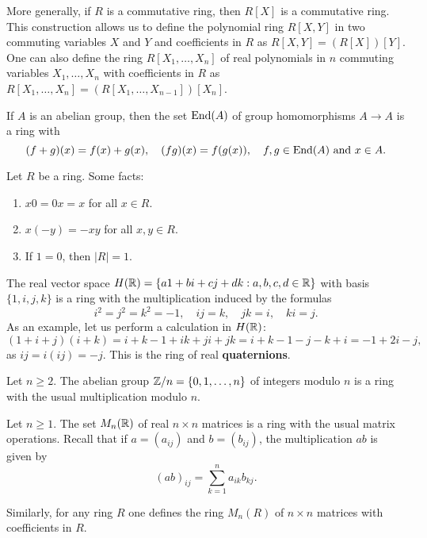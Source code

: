 More generally, if $R$ is a commutative ring, then $R[X]$ is a commutative ring. This construction
allows us to define 
the polynomial ring $R[X,Y]$ in two commuting variables $X$ and $Y$ and coefficients in $R$ as 
$R[X,Y]=(R[X])[Y]$. One can also define the ring  
$R[X_1,\dots,X_n]$ of real polynomials 
in $n$ commuting variables $X_1,\dots,X_n$ with coefficients in $R$ as 
$R[X_1,\dots,X_n]
=(R[X_1,\dots,X_{n-1}])[X_n]$.

\begin{example}
    If $A$ is an abelian group, then 
    the set 
    $\operatorname{End}(A)$ of group homomorphisms $A\to A$ is a ring with
    \[
    (f+g)(x)=f(x)+g(x),\quad
    (fg)(x)=f(g(x)),\quad f,g\in\operatorname{End}(A)\text{ and }x\in A.
    \]
\end{example}

Let $R$ be a ring. 
Some facts:
\begin{enumerate}
    \item $x0=0x=x$ for all $x\in R$.
    \item $x(-y)=-xy$ for all $x,y\in R$.
    \item If $1=0$, then $|R|=1$. 
\end{enumerate}

\begin{example}
    The real vector space $H(\mathbb{R})=\{a1+bi+cj+dk:a,b,c,d\in\mathbb{R}\}$ with basis $\{1,i,j,k\}$ 
    is a ring with the multiplication induced by
    the formulas 
    \[
    i^2=j^2=k^2=-1,
    \quad ij=k,
    \quad jk=i,
    \quad ki=j.
    \]
    As an example, let us perform a calculation in $H(\mathbb{R})$: 
    \[
    (1+i+j)(i+k)=i+k-1+ik+ji+jk=i+k-1-j-k+i=-1+2i-j,
    \]
    as $ij=i(ij)=-j$. This is the ring of real \textbf{quaternions}.
\end{example}

\begin{example}
    Let $n\geq2$. 
    The abelian group $\mathbb{Z}/n=\{0,1,\dots,n\}$ of integers modulo $n$ is a ring 
    with the usual multiplication modulo $n$. 
\end{example}

\begin{example}
    Let $n\geq1$. 
    The set $M_n(\mathbb{R})$ of real $n\times n$ matrices is a ring with the usual matrix operations. Recall
    that if $a=(a_{ij})$ and $b=(b_{ij})$, the multiplication $ab$ is given by
    \[
    (ab)_{ij}=\sum_{k=1}^n a_{ik}b_{kj}.
    \]
\end{example}

Similarly, for any ring $R$ one defines the ring $M_n(R)$ of $n\times n$ matrices
with coefficients in $R$. 

